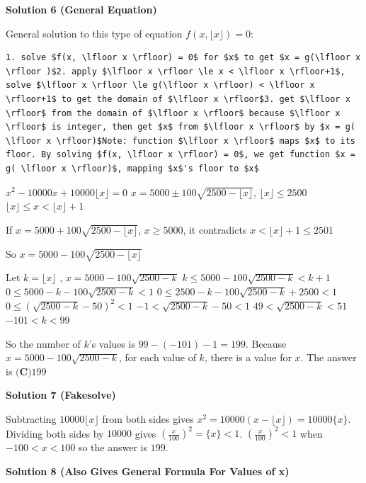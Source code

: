 \begin{enumerate}
 



\textbf{Solution 6 (General Equation)}

General solution to this type of equation $f(x, \lfloor x \rfloor) = 0$:

 \begin{verbatim}
1. solve $f(x, \lfloor x \rfloor) = 0$ for $x$ to get $x = g(\lfloor x \rfloor )$2. apply $\lfloor x \rfloor \le x < \lfloor x \rfloor+1$, solve $\lfloor x \rfloor \le g(\lfloor x \rfloor) < \lfloor x \rfloor+1$ to get the domain of $\lfloor x \rfloor$3. get $\lfloor x \rfloor$ from the domain of $\lfloor x \rfloor$ because $\lfloor x \rfloor$ is integer, then get $x$ from $\lfloor x \rfloor$ by $x = g( \lfloor x \rfloor)$Note: function $\lfloor x \rfloor$ maps $x$ to its floor. By solving $f(x, \lfloor x \rfloor) = 0$, we get function $x = g( \lfloor x \rfloor)$, mapping $x$'s floor to $x$
\end{verbatim}

$x^2 - 10000x + 10000 \lfloor x \rfloor =0$
$x=5000 \pm 100 \sqrt{2500- \lfloor x \rfloor}$, $\lfloor x \rfloor \le 2500$
$\lfloor x \rfloor \le x < \lfloor x \rfloor + 1$

 If $x= 5000 + 100 \sqrt{2500 - \lfloor x \rfloor}$, $x \ge 5000$, it contradicts $x < \lfloor x \rfloor + 1 \le 2501$

 So $x= 5000 - 100 \sqrt{2500 - \lfloor x \rfloor}$

 Let $k = \lfloor x \rfloor$ , $x= 5000 - 100 \sqrt{2500 - k}$
$k \le 5000 - 100 \sqrt{2500 - k} < k + 1$
$0 \le 5000 - k - 100 \sqrt{2500 - k} < 1$
$0 \le 2500 - k - 100 \sqrt{2500 - k} + 2500 < 1$
$0 \le (\sqrt{2500 - k} - 50)^2 < 1$
$-1 < \sqrt{2500 - k} - 50 < 1$
$49 < \sqrt{2500 - k} < 51$
$-101 < k < 99$

 So the number of $k$'s values is $99-(-101)-1=199$. Because $x=5000-100\sqrt{2500-k}$, for each value of $k$, there is a value for $x$. The answer is $\boxed{\textbf{(C)} 199}$




\textbf{Solution 7 (Fakesolve)}

Subtracting $10000\lfloor x\rfloor$ from both sides gives $x^2=10000(x-\lfloor x\rfloor)=10000\{x\}$. Dividing both sides by $10000$ gives $\left(\frac{x}{100}\right)^2=\{x\}<1$.  $\left(\frac{x}{100}\right)^2<1$ when $-100<x<100$ so the answer is $\boxed{199}$.

 



\textbf{Solution 8 (Also Gives General Formula For Values of x)}


\end{enumerate}
